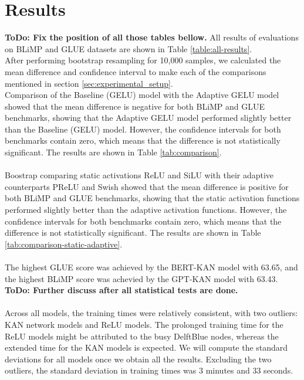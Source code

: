 \section{Results} %
\label{sec:results}
\textbf{ToDo: Fix the position of all those tables bellow.}
All results of evaluations on BLiMP and GLUE datasets are shown in Table \ref{table:all-results}.\\
After performing bootstrap resampling for 10,000 samples, we calculated the mean difference and confidence interval to make each of the comparisons mentioned in section \ref{sec:experimental_setup}.\\
Comparison of the Baseline (GELU) model with the Adaptive GELU model showed that the mean difference is negative for both BLiMP and GLUE benchmarks, showing that the Adaptive GELU model performed slightly better than the Baseline (GELU) model. However, the confidence intervals for both benchmarks contain zero, which means that the difference is not statistically significant. The results are shown in Table \ref{tab:comparison}.\\\\
Boostrap comparing static activations ReLU and SiLU with their adaptive counterparts PReLU and Swish showed that the mean difference is positive for both BLiMP and GLUE benchmarks, showing that the static activation functions performed slightly better than the adaptive activation functions. However, the confidence intervals for both benchmarks contain zero, which means that the difference is not statistically significant. The results are shown in Table \ref{tab:comparison-static-adaptive}.\\\\
The highest GLUE score was achieved by the BERT-KAN model with 63.65, and the highest BLiMP score was achevied by the GPT-KAN model with 63.43. \textbf{ToDo: Further discuss after all statistical tests are done.}\\\\
Across all models, the training times were relatively consistent, with two outliers: KAN network models and ReLU models. The prolonged training time for the ReLU models might be attributed to the busy DelftBlue nodes, whereas the extended time for the KAN models is expected. We will compute the standard deviations for all models once we obtain all the results. Excluding the two outliers, the standard deviation in training times was 3 minutes and 33 seconds.

